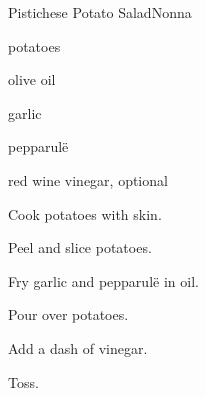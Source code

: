 \begin{recipe}{Pistichese Potato Salad}{Nonna}{}

\begin{ingredients}
\item potatoes
\item olive oil
\item garlic
\item pepparul\"e
\item red wine vinegar, optional
\end{ingredients}

\begin{directions}
\item Cook potatoes with skin.
\item Peel and slice potatoes.
\item Fry garlic and pepparul\"e in oil.
\item Pour over potatoes.
\item Add a dash of vinegar.
\item Toss.
\end{directions}

\end{recipe}
